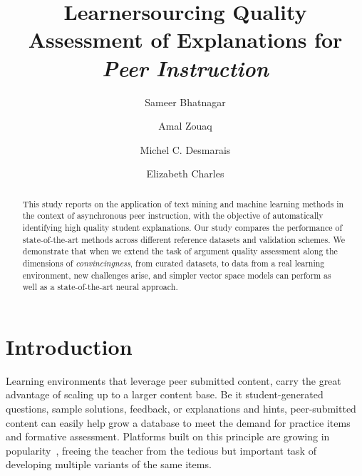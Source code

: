 \documentclass[runningheads]{llncs}
\begin{document}
%
\title{Learnersourcing Quality Assessment of Explanations for \textit{Peer 
Instruction}}
%
\author{Sameer Bhatnagar \and
Amal Zouaq \and
Michel C. Desmarais \and
Elizabeth Charles
}




%
\maketitle              %
%
\begin{abstract}
This study reports on the application of text mining and machine learning 
methods in the context of asynchronous peer instruction, with the objective of 
automatically identifying high quality student explanations. 
Our study compares the performance of state-of-the-art methods across different 
reference datasets and validation schemes.
We demonstrate that when we extend the task of argument quality assessment 
along the dimensions of \textit{convincingness}, from curated datasets, to data 
from a real learning environment, new challenges arise, and simpler vector 
space models can perform as well as a state-of-the-art neural approach. 

\end{abstract}


\section{Introduction}

Learning environments that leverage peer submitted content, carry the great 
advantage of scaling up to a larger content base.  
Be it student-generated questions, sample solutions, feedback, or explanations 
and hints, peer-submitted content can easily help grow a database to meet the 
demand for practice items and formative assessment.
Platforms built on this principle are growing in 
popularity~\cite{denny_effect_2013}\cite{khosravi_ripple_2019}, freeing the 
teacher from the tedious but important task of developing multiple variants of 
the same 
items. 
\end{document}
